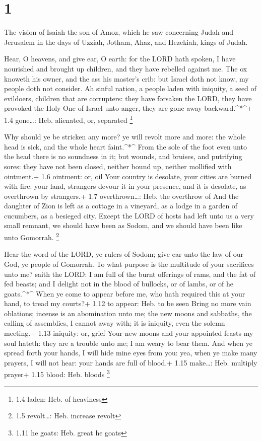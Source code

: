 \hypertarget{section}{%
\section{1}\label{section}}

 The vision of Isaiah the son of Amoz, which he saw
concerning Judah and Jerusalem in the days of Uzziah, Jotham, Ahaz, and
Hezekiah, kings of Judah.

 Hear, O heavens, and give ear, O earth: for the LORD hath
spoken, I have nourished and brought up children, and they have rebelled
against me.  The ox knoweth his owner, and the ass his
master's crib: but Israel doth not know, my people doth not consider.
 Ah sinful nation, a people laden with iniquity, a seed of
evildoers, children that are corrupters: they have forsaken the LORD,
they have provoked the Holy One of Israel unto anger, they are gone away
backward.\^{}*\^{}+ 1.4 gone\ldots: Heb. alienated, or, separated
\footnote{1.4 laden: Heb. of heaviness}

 Why should ye be stricken any more? ye will revolt more and
more: the whole head is sick, and the whole heart faint.\^{}*\^{}
 From the sole of the foot even unto the head there is no
soundness in it; but wounds, and bruises, and putrifying sores: they
have not been closed, neither bound up, neither mollified with
ointment.+ 1.6 ointment: or, oil  Your country is desolate,
your cities are burned with fire: your land, strangers devour it in your
presence, and it is desolate, as overthrown by strangers.+ 1.7
overthrown\ldots: Heb. the overthrow of  And the daughter of
Zion is left as a cottage in a vineyard, as a lodge in a garden of
cucumbers, as a besieged city.  Except the LORD of hosts had
left unto us a very small remnant, we should have been as Sodom, and we
should have been like unto Gomorrah. \footnote{1.5 revolt\ldots: Heb.
  increase revolt}

 Hear the word of the LORD, ye rulers of Sodom; give ear
unto the law of our God, ye people of Gomorrah.  To what
purpose is the multitude of your sacrifices unto me? saith the LORD: I
am full of the burnt offerings of rams, and the fat of fed beasts; and I
delight not in the blood of bullocks, or of lambs, or of he
goats.\^{}*\^{}  When ye come to appear before me, who hath
required this at your hand, to tread my courts?+ 1.12 to appear: Heb. to
be seen  Bring no more vain oblations; incense is an
abomination unto me; the new moons and sabbaths, the calling of
assemblies, I cannot away with; it is iniquity, even the solemn
meeting.+ 1.13 iniquity: or, grief  Your new moons and your
appointed feasts my soul hateth: they are a trouble unto me; I am weary
to bear them.  And when ye spread forth your hands, I will
hide mine eyes from you: yea, when ye make many prayers, I will not
hear: your hands are full of blood.+ 1.15 make\ldots: Heb. multiply
prayer+ 1.15 blood: Heb. bloods \footnote{1.11 he goats: Heb. great he
  goats}

